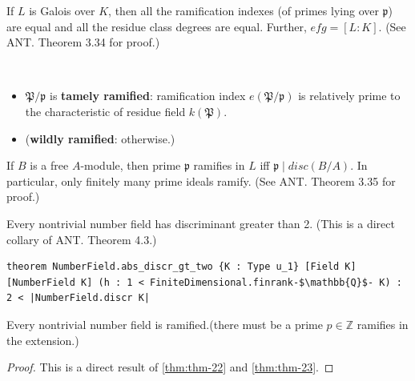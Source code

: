 \begin{thm}
    \label{tab:thm-21}
    If $L$ is Galois over $K$, then all the ramification indexes (of primes lying over $\mathfrak{p}$) are equal and all the residue class degrees are equal. Further, $efg=[L : K]$. (See ANT. Theorem 3.34 for proof.)
\end{thm}
\begin{defi}
~\begin{itemize}
    \item $\mathfrak{P}/\mathfrak{p}$ is \textbf{tamely ramified}: ramification index $e(\mathfrak{P}/\mathfrak{p})$ is relatively prime to the characteristic of residue field $k(\mathfrak{P})$.
    \item (\textbf{wildly ramified}: otherwise.)
\end{itemize}
\end{defi}
\begin{thm}
    \label{thm:thm-22}
    If $B$ is a free $A$-module, then prime $\mathfrak{p}$ ramifies in $L$ iff $\mathfrak{p} \mid disc(B/A)$. In particular, only finitely many prime ideals ramify. \rm{(See ANT. Theorem 3.35 for proof.)}
\end{thm}
\begin{thm}[Hermite]
    \label{thm:thm-23}
    Every nontrivial number field has discriminant greater than 2. \rm{(This is a direct collary of ANT. Theorem 4.3.)}
    \begin{listing}[!htpb]
    \begin{verbatim}
theorem NumberField.abs_discr_gt_two {K : Type u_1} [Field K] [NumberField K] (h : 1 < FiniteDimensional.finrank-$\mathbb{Q}$- K) : 2 < |NumberField.discr K|
    \end{verbatim}
    \end{listing}
\end{thm}
\begin{thm}[Minkowski]
    \label{thm:thm-24}
Every nontrivial number field is ramified.\rm{(there must be a prime $p \in \mathbb{Z}$ ramifies in the extension.)}
\begin{proof}
This is a direct result of \autoref{thm:thm-22} and \autoref{thm:thm-23}.
\end{proof}
\end{thm}
\newpage
